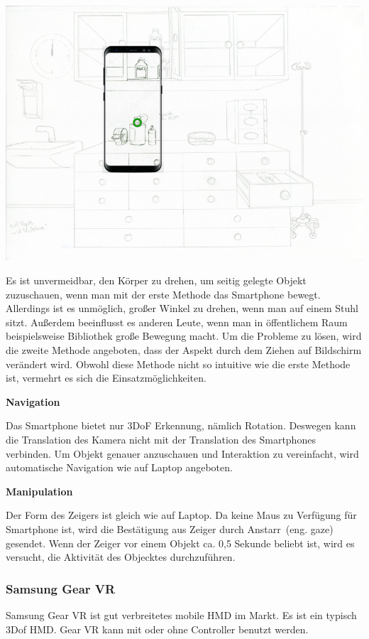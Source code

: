   \includegraphics[width=\textwidth]{images/paperPrototypewiths8mini.png}
  
  Es ist unvermeidbar, den Körper zu drehen, um seitig gelegte Objekt zuzuschauen, wenn man mit der erste Methode das Smartphone bewegt. Allerdings ist es unmöglich, großer Winkel zu drehen, wenn man auf einem Stuhl sitzt. Außerdem beeinflusst es anderen Leute, wenn man in öffentlichem Raum beispielsweise Bibliothek große Bewegung macht. Um die Probleme zu lösen, wird die zweite Methode angeboten, dass der Aspekt durch dem Ziehen auf Bildschirm verändert wird. Obwohl diese Methode nicht so intuitive wie die erste Methode ist, vermehrt es sich die Einsatzmöglichkeiten.
  
  \textbf{Navigation}
  
  Das Smartphone bietet nur 3DoF Erkennung, nämlich Rotation. Deswegen kann die Translation des Kamera nicht mit der Translation des Smartphones verbinden. Um Objekt genauer anzuschauen und Interaktion zu vereinfacht, wird automatische Navigation wie auf Laptop angeboten.
  
  \textbf{Manipulation}
  
  Der Form des Zeigers ist gleich wie auf Laptop. Da keine Maus zu Verfügung für Smartphone ist, wird die Bestätigung aus Zeiger durch \glqq Anstarr\grqq\ (eng. gaze) gesendet. Wenn der Zeiger vor einem Objekt ca. 0,5 Sekunde beliebt ist, wird es versucht, die Aktivität des Objecktes durchzuführen.
  
 \subsubsection{Samsung Gear VR}
 Samsung Gear VR ist gut verbreitetes mobile HMD im Markt. Es ist ein typisch 3Dof HMD. Gear VR kann mit oder ohne Controller benutzt werden.
 
